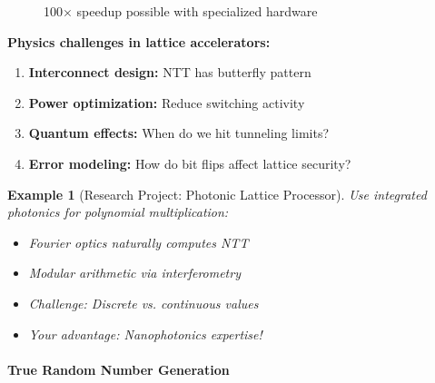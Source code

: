 \documentclass[11pt,a4paper]{article}
\newtheorem{example}{Example}
\begin{document}
\begin{figure}[h]
\centering
{}
\caption{100× speedup possible with specialized hardware}
\end{figure}

\textbf{Physics challenges in lattice accelerators:}
\begin{enumerate}
    \item \textbf{Interconnect design:} NTT has butterfly pattern
    \item \textbf{Power optimization:} Reduce switching activity
    \item \textbf{Quantum effects:} When do we hit tunneling limits?
    \item \textbf{Error modeling:} How do bit flips affect lattice security?
\end{enumerate}

\begin{example}[Research Project: Photonic Lattice Processor]
Use integrated photonics for polynomial multiplication:
\begin{itemize}
    \item Fourier optics naturally computes NTT
    \item Modular arithmetic via interferometry
    \item Challenge: Discrete vs. continuous values
    \item Your advantage: Nanophotonics expertise!
\end{itemize}
\end{example}

\paragraph{True Random Number Generation}
\end{document}
